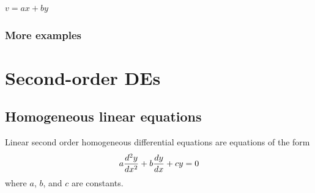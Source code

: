 \documentclass{book}
\begin{document}

$v = ax + by$


\newpage
\subsection{More examples}









\newpage
\chapter{Second-order DEs}


\newpage
\section{Homogeneous linear equations}

Linear second order homogeneous differential equations are equations
of the form
\begin{equation}
  \label{eq:second_order_linear_homogeneous}
  a \frac{d^2 y}{d x^2} + b \frac{d y}{d x} + c y = 0
\end{equation}
where $a$, $b$, and $c$ are constants.
\end{document}
